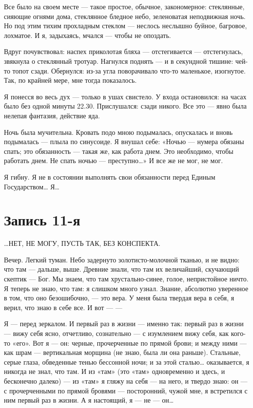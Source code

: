 \documentclass[11pt,openany]{book}
\newcommand{\bookchapterplain}[1]{%
  \clearpage\phantomsection\chapter*{#1}%
  \addcontentsline{toc}{chapter}{#1}\markboth{#1}{#1}\thispagestyle{plain}}
\begin{document}
Все было на своем месте --- такое простое, обычное, закономерное: стеклянные, сияющие огнями дома, стеклянное бледное небо, зеленоватая неподвижная ночь. Но под этим тихим прохладным стеклом --- неслось неслышно буйное, багровое, лохматое. И я, задыхаясь, мчался --- чтобы не опоздать.

Вдруг почувствовал: наспех приколотая бляха --- отстегивается --- отстегнулась, звякнула о стеклянный тротуар. Нагнулся поднять --- и в секундной тишине: чей-то топот сзади. Обернулся: из-за угла поворачивало что-то маленькое, изогнутое. Так, по крайней мере, мне тогда показалось.

Я понесся во весь дух --- только в ушах свистело. У входа остановился: на часах было без одной минуты 22.30. Прислушался: сзади никого. Все это --- явно была нелепая фантазия, действие яда.

Ночь была мучительна. Кровать подо мною подымалась, опускалась и вновь подымалась --- плыла по синусоиде. Я внушал себе: «Ночью --- нумера обязаны спать; это обязанность --- такая же, как работа днем. Это необходимо, чтобы работать днем. Не спать ночью --- преступно\ldots{}» И все же не мог, не мог.

Я гибну. Я не в состоянии выполнять свои обязанности перед Единым Государством\ldots{} Я\ldots{}

\bookchapterplain{Запись 11-я}

\begin{center}\textsc{\ldots{}НЕТ, НЕ МОГУ, ПУСТЬ ТАК, БЕЗ КОНСПЕКТА.}\end{center}

Вечер. Легкий туман. Небо задернуто золотисто-молочной тканью, и не видно: что там --- дальше, выше. Древние знали, что там их величайший, скучающий скептик --- Бог. Мы знаем, что там хрустально-синее, голое, непристойное ничто. Я теперь не знаю, что там: я слишком много узнал. Знание, абсолютно уверенное в том, что оно безошибочно, --- это вера. У меня была твердая вера в себя, я верил, что знаю в себе все. И вот --- ---

Я --- перед зеркалом. И первый раз в жизни --- именно так: первый раз в жизни --- вижу себя ясно, отчетливо, сознательно --- с изумлением вижу себя, как кого-то «его». Вот я --- он: черные, прочерченные по прямой брови; и между ними --- как шрам --- вертикальная морщина (не знаю, была ли она раньше). Стальные, серые глаза, обведенные тенью бессонной ночи; и за этой сталью\ldots{} оказывается, я никогда не знал, что там. И из «там» (это «там» одновременно и здесь, и бесконечно далеко) --- из «там» я гляжу на себя --- на него, и твердо знаю: он --- с прочерченными по прямой бровями --- посторонний, чужой мне, я встретился с ним первый раз в жизни. А я настоящий, я --- не --- он\ldots{}
\end{document}
